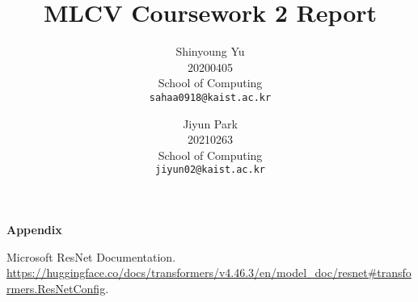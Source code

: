 \documentclass[10pt,twocolumn,letterpaper]{article}
\begin{document}
\pagestyle{plain}

\title{MLCV Coursework 2 Report}

\author{Shinyoung Yu\\
20200405\\
School of Computing\\
{\tt\small sahaa0918@kaist.ac.kr}
\and
Jiyun Park\\
20210263\\
School of Computing\\
{\tt\small jiyun02@kaist.ac.kr}
}

\maketitle

%    





\onecolumn
\newpage
{\LARGE 
	\textbf{Appendix}\par}
\appendix


\begin{thebibliography}{9}
	Microsoft ResNet Documentation.
	\url{https://huggingface.co/docs/transformers/v4.46.3/en/model_doc/resnet#transformers.ResNetConfig}.
\end{thebibliography}

% 
\end{document}
